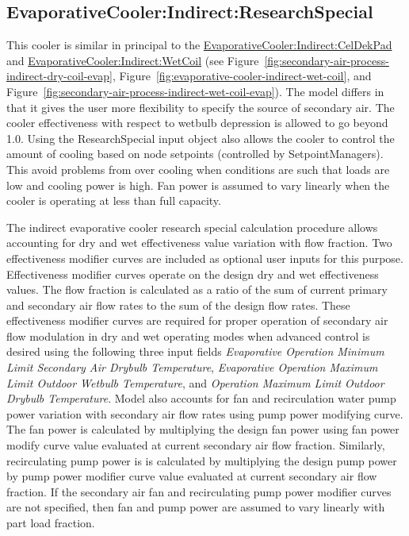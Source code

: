 \subsection{EvaporativeCooler:Indirect:ResearchSpecial}\label{evaporativecoolerindirectresearchspecial}

This cooler is similar in principal to the \hyperref[evaporativecoolerindirectceldekpad]{EvaporativeCooler:Indirect:CelDekPad} and \hyperref[evaporativecoolerindirectwetcoil]{EvaporativeCooler:Indirect:WetCoil} (see Figure~\ref{fig:secondary-air-process-indirect-dry-coil-evap}, Figure~\ref{fig:evaporative-cooler-indirect-wet-coil}, and Figure~\ref{fig:secondary-air-process-indirect-wet-coil-evap}). The model differs in that it gives the user more flexibility to specify the source of secondary air. The cooler effectiveness with respect to wetbulb depression is allowed to go beyond 1.0. Using the ResearchSpecial input object also allows the cooler to control the amount of cooling based on node setpoints (controlled by SetpointManagers). This avoid problems from over cooling when conditions are such that loads are low and cooling power is high. Fan power is assumed to vary linearly when the cooler is operating at less than full capacity.

The indirect evaporative cooler research special calculation procedure allows accounting for dry and wet effectiveness value variation with flow fraction. Two effectiveness modifier curves are included as optional user inputs for this purpose. Effectiveness modifier curves operate on the design dry and wet effectiveness values. The flow fraction is calculated as a ratio of the sum of current primary and secondary air flow rates to the sum of the design flow rates. These effectiveness modifier curves are required for proper operation of secondary air flow modulation in dry and wet operating modes when advanced control is desired using the following three input fields \textit{Evaporative Operation Minimum Limit Secondary Air Drybulb Temperature}, \textit{Evaporative Operation Maximum Limit Outdoor Wetbulb Temperature}, and \textit{Operation Maximum Limit Outdoor Drybulb Temperature}. Model also accounts for fan and recirculation water pump power variation with secondary air flow rates using pump power modifying curve. The fan power is calculated by multiplying the design fan power using fan power modify curve value evaluated at current secondary air flow fraction. Similarly, recirculating pump power is is calculated by multiplying the design pump power by pump power modifier curve value evaluated at current secondary air flow fraction. If the secondary air fan and recirculating pump power modifier curves are not specified, then fan and pump power are assumed to vary linearly with part load fraction.

